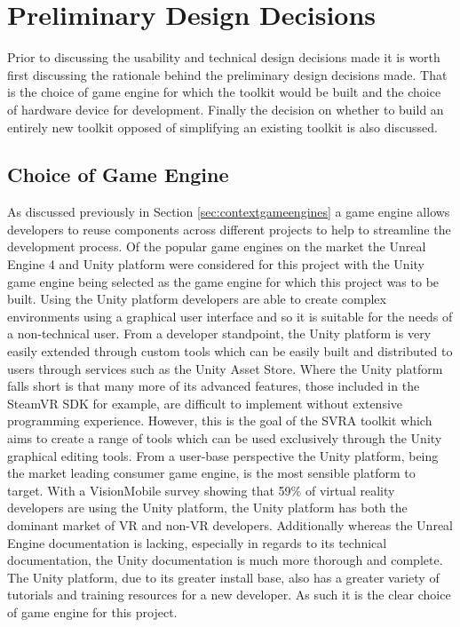 \documentclass{l4proj}
\begin{document}
\section{Preliminary Design Decisions}
Prior to discussing the usability and technical design decisions made it is worth first discussing the rationale behind the preliminary design decisions made. That is the choice of game engine for which the toolkit would be built and the choice of hardware device for development. Finally the decision on whether to build an entirely new toolkit opposed of simplifying an existing toolkit is also discussed.

\subsection{Choice of Game Engine}
\label{sec:decisionunity}
As discussed previously in Section \ref{sec:contextgameengines} a game engine allows developers to reuse components across different projects to help to streamline the development process. Of the popular game engines on the market the Unreal Engine 4 and Unity platform were considered for this project with the Unity game engine being selected as the game engine for which this project was to be built. Using the Unity platform developers are able to create complex environments using a graphical user interface and so it is suitable for the needs of a non-technical user. From a developer standpoint, the Unity platform is very easily extended through custom tools which can be easily built and distributed to users through services such as the Unity Asset Store. Where the Unity platform falls short is that many more of its advanced features, those included in the SteamVR SDK for example, are difficult to implement without extensive programming experience. However, this is the goal of the SVRA toolkit which aims to create a range of tools which can be used exclusively through the Unity graphical editing tools. From a user-base perspective the Unity platform, being the market leading consumer game engine, is the most sensible platform to target. With a VisionMobile survey \cite{VisionMobile} showing that 59\% of virtual reality developers are using the Unity platform, the Unity platform has both the dominant market of VR and non-VR developers. Additionally whereas the Unreal Engine documentation is lacking, especially in regards to its technical documentation, the Unity documentation is much more thorough and complete. The Unity platform, due to its greater install base, also has a greater variety of tutorials and training resources for a new developer. As such it is the clear choice of game engine for this project. 
\end{document}
